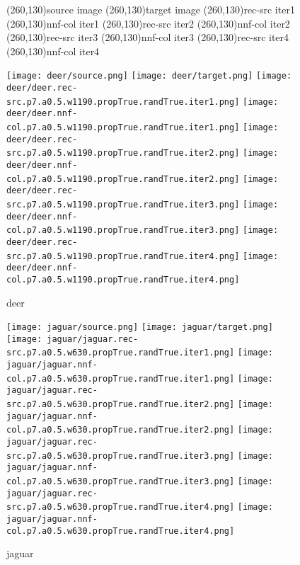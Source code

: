 \documentclass{article}
\begin{document}
\begin{center}
\textbf{\large{}}
\end{center}

\begin{figure}[H]
\centering
\framebox(260,130){source image}\enskip
\framebox(260,130){target image}
\framebox(260,130){rec-src iter1}\enskip
\framebox(260,130){nnf-col iter1}
\framebox(260,130){rec-src iter2}\enskip
\framebox(260,130){nnf-col iter2}
\framebox(260,130){rec-src iter3}\enskip
\framebox(260,130){nnf-col iter3}
\framebox(260,130){rec-src iter4}\enskip
\framebox(260,130){nnf-col iter4}
\end{figure}

\begin{figure}[H]
\centering
\texttt{[image: deer/source.png]}\enskip
\texttt{[image: deer/target.png]}
\texttt{[image: deer/deer.rec-src.p7.a0.5.w1190.propTrue.randTrue.iter1.png]}\enskip
\texttt{[image: deer/deer.nnf-col.p7.a0.5.w1190.propTrue.randTrue.iter1.png]}
\texttt{[image: deer/deer.rec-src.p7.a0.5.w1190.propTrue.randTrue.iter2.png]}\enskip
\texttt{[image: deer/deer.nnf-col.p7.a0.5.w1190.propTrue.randTrue.iter2.png]}
\texttt{[image: deer/deer.rec-src.p7.a0.5.w1190.propTrue.randTrue.iter3.png]}\enskip
\texttt{[image: deer/deer.nnf-col.p7.a0.5.w1190.propTrue.randTrue.iter3.png]}
\texttt{[image: deer/deer.rec-src.p7.a0.5.w1190.propTrue.randTrue.iter4.png]}\enskip
\texttt{[image: deer/deer.nnf-col.p7.a0.5.w1190.propTrue.randTrue.iter4.png]}
\caption{deer}
\end{figure}

\begin{figure}[H]
\centering
\texttt{[image: jaguar/source.png]}\enskip
\texttt{[image: jaguar/target.png]}
\texttt{[image: jaguar/jaguar.rec-src.p7.a0.5.w630.propTrue.randTrue.iter1.png]}\enskip
\texttt{[image: jaguar/jaguar.nnf-col.p7.a0.5.w630.propTrue.randTrue.iter1.png]}
\texttt{[image: jaguar/jaguar.rec-src.p7.a0.5.w630.propTrue.randTrue.iter2.png]}\enskip
\texttt{[image: jaguar/jaguar.nnf-col.p7.a0.5.w630.propTrue.randTrue.iter2.png]}
\texttt{[image: jaguar/jaguar.rec-src.p7.a0.5.w630.propTrue.randTrue.iter3.png]}\enskip
\texttt{[image: jaguar/jaguar.nnf-col.p7.a0.5.w630.propTrue.randTrue.iter3.png]}
\texttt{[image: jaguar/jaguar.rec-src.p7.a0.5.w630.propTrue.randTrue.iter4.png]}\enskip
\texttt{[image: jaguar/jaguar.nnf-col.p7.a0.5.w630.propTrue.randTrue.iter4.png]}
\caption{jaguar}
\end{figure}
\end{document}
